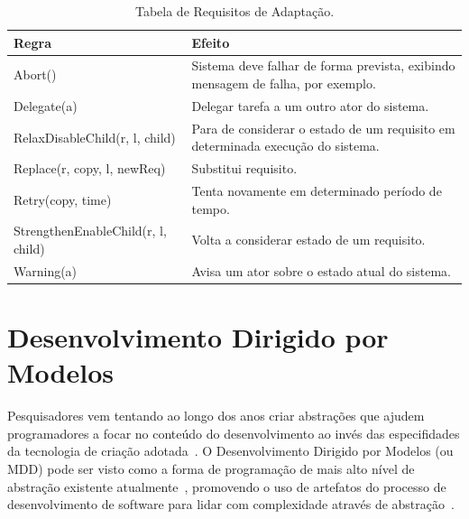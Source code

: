 \begin{table}
	\centering
	\caption{Tabela de Requisitos de Adaptação.}
	\label{awreqs-zanshin}
	\begin{tabularx}{\textwidth}{|l|X|}
		\hline
		\textbf{Regra}                              & \textbf{Efeito}                                                                          \\ \hline
		Abort()                            & Sistema deve falhar de forma prevista, exibindo mensagem de falha, por exemplo. \\ \hline
		Delegate(a)                        & Delegar tarefa a um outro ator do sistema.                                      \\ \hline
		RelaxDisableChild(r, l, child)     & Para de considerar o estado de um requisito em determinada execução do sistema. \\ \hline
		Replace(r, copy, l, newReq)        & Substitui requisito.                                                            \\ \hline
		Retry(copy, time)                  & Tenta novamente em determinado período de tempo.                                \\ \hline
		StrengthenEnableChild(r, l, child) & Volta a considerar estado de um requisito.                                      \\ \hline
		Warning(a)                         & Avisa um ator sobre o estado atual do sistema.                                  \\ \hline
	\end{tabularx}
\end{table}


\section{Desenvolvimento Dirigido por Modelos}
\label{referencial-mdd}
Pesquisadores vem tentando ao longo dos anos criar abstrações que ajudem programadores a focar no conteúdo do desenvolvimento ao invés das especifidades da tecnologia de criação adotada~\cite{viyovic2014sirius}. O Desenvolvimento Dirigido por Modelos (\mdd ou MDD) pode ser visto como a forma de programação de mais alto nível de abstração existente atualmente~\cite{atkinson2003model}, promovendo o uso de artefatos do processo de desenvolvimento de software para lidar com complexidade através de abstração~\cite{viyovic2014sirius}.

